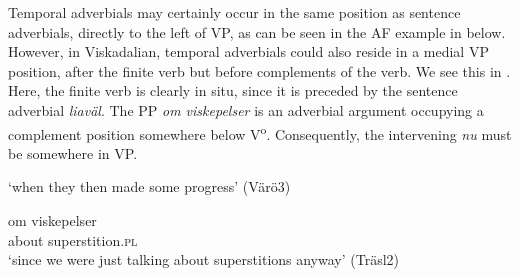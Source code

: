 \documentclass[output=paper,colorlinks,citecolor=brown,draft,draftmode]{langscibook}
\begin{document}
Temporal adverbials may certainly occur in the same position as sentence adverbials, directly to the left of VP, as can be seen in the AF example in  below. However, in Viskadalian, temporal adverbials could also reside in a medial VP position, after the finite verb but before complements of the verb. We see this in . Here, the finite verb is clearly in situ, since it is preceded by the sentence adverbial \textit{liaväl}. The PP \textit{om viskepelser} is an adverbial argument occupying a complement position somewhere below V\textsuperscript{o}. Consequently, the intervening \textit{nu} must be somewhere in VP.


\ea\label{ex:petzell:18}
\glt `when they then made some progress’ (Värö3)

\gll    om      viskepelser   \\
    about    superstition.\textsc{pl}\\
\glt `since we were just talking about superstitions anyway’ (Träsl2)
\z
\z
\end{document}
